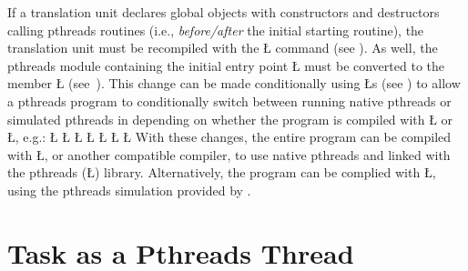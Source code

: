 \documentclass[openright,twoside]{report}
\begin{document}
If a translation unit declares global objects with constructors and destructors calling pthreads routines (i.e., \emph{before/after} the initial starting routine), the translation unit must be recompiled with the \LGinlinetrue\LGbegin\lgrinde\L{}\endlgrinde\LGend{} command (see ).
As well, the pthreads module containing the initial entry point \LGinlinetrue\LGbegin\lgrinde\L{}\endlgrinde\LGend{} must be converted to the \uC member \LGinlinetrue\LGbegin\lgrinde\L{}\endlgrinde\LGend{} (see~).
This change can be made conditionally using \LGinlinetrue\LGbegin\lgrinde\L{}\endlgrinde\LGend{}s (see ) to allow a pthreads program to conditionally switch between running native pthreads or simulated pthreads in \uC depending on whether the program is compiled with \LGinlinetrue\LGbegin\lgrinde\L{}\endlgrinde\LGend{} or \LGinlinetrue\LGbegin\lgrinde\L{}\endlgrinde\LGend{}, e.g.:
\LGinlinefalse\LGbegin\lgrinde
\L{}
\L{}
\CE{}\L{}
\L{}
\L{}
\L{\LB{}}
\CE{}\L{\LB{\}}}
\endlgrinde\LGend
With these changes, the entire program can be compiled with \LGinlinetrue\LGbegin\lgrinde\L{}\endlgrinde\LGend{}, or another compatible \CC compiler, to use native pthreads and linked with the pthreads (\LGinlinetrue\LGbegin\lgrinde\L{}\endlgrinde\LGend{}) library.
Alternatively, the program can be complied with \LGinlinetrue\LGbegin\lgrinde\L{}\endlgrinde\LGend{}, using the pthreads simulation provided by \uC.


\section{\texorpdfstring{\uC Task as a Pthreads Thread}{uC++ Task as a Pthreads Thread}}
\end{document}
